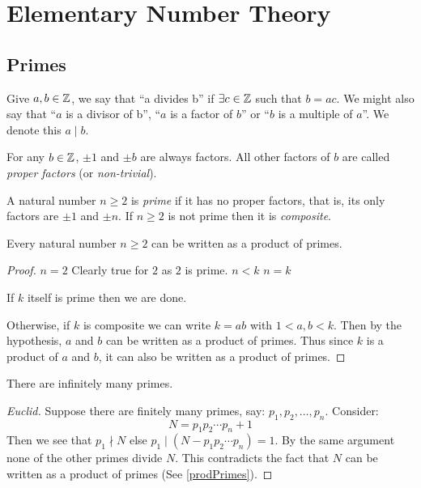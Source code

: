 \documentclass[../main.tex]{subfiles}
\begin{document}
\chapter{Elementary Number Theory}
\section{Primes}
\begin{definition}[Divisibility]
  Give $a, b \in \mathbb{Z}$, we say that ``a divides b'' if $\exists c \in \mathbb{Z}$ such that $b = ac$.
  We might also say that ``$a$ is a divisor of b'', ``$a$ is a factor of $b$'' or ``$b$ is a multiple of $a$''.
  We denote this $a \mid b$.
\end{definition}
For any $b \in \mathbb{Z}$, $\pm1$ and $\pm b$ are always factors.
All other factors of $b$ are called \textit{proper factors} (or \textit{non-trivial}).
\begin{definition}
  A natural number $n \geq 2$ is \textit{prime} if it has no proper factors, that is, its only factors are $\pm 1$ and $\pm n$.
  If $n \geq 2$ is not prime then it is \textit{composite}.
\end{definition}
\begin{proposition}
  Every natural number $n \geq 2$ can be written as a product of primes.
  \label{prodPrimes}
\end{proposition}
\begin{proof}
  \induction
  {$n = 2$}{
    Clearly true for $2$ as $2$ is prime.
  }
  {$n < k$}{}
  {$n = k$}{
     If $k$ itself is prime then we are done.

     Otherwise, if $k$ is composite we can write $k = ab$ with $1 < a, b < k$.
     Then by the hypothesis, $a$ and $b$ can be written as a product of primes.
     Thus since $k$ is a product of $a$ and $b$, it can also be written as a product of primes.
  }
\end{proof}
\begin{theorem}
  There are infinitely many primes.
\end{theorem}
\begin{proof}[Euclid]
  Suppose there are finitely many primes, say: $p_1, p_2, \ldots, p_n$. Consider:
  \[
    N = p_1 p_2 \cdots p_n + 1
  \]
  Then we see that $p_1 \nmid N$ else $p_1 \mid (N - p_1 p_2 \cdots p_n) = 1$.
  By the same argument none of the other primes divide $N$.
  This contradicts the fact that $N$ can be written as a product of primes (See \cref{prodPrimes}).
\end{proof}
\end{document}
